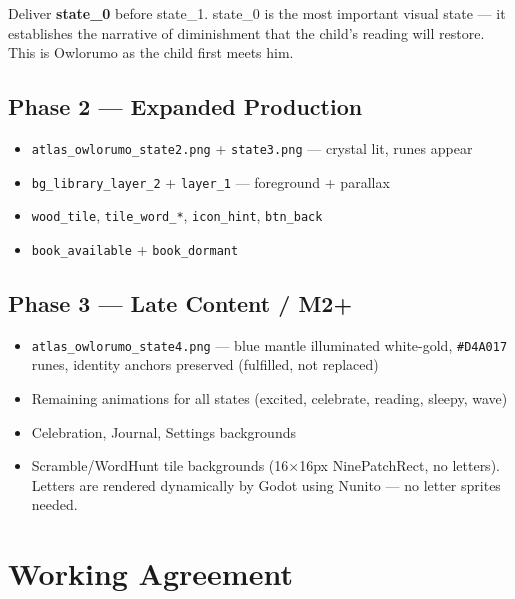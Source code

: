 \documentclass[11pt, a4paper]{article}
\newcommand{\hex}[1]{\textcolor[HTML]{#1}{\texttt{\##1}}}
\begin{document}
\begin{notebox}
  Deliver \textbf{state\_0} before state\_1. state\_0 is the most important visual state
  --- it establishes the narrative of diminishment that the child's reading will restore.
  This is Owlorumo as the child first meets him.
\end{notebox}

\subsection{Phase 2 --- Expanded Production}
\begin{itemize}[leftmargin=1.5em, itemsep=2pt]
  \item \texttt{atlas\_owlorumo\_state2.png} + \texttt{state3.png} --- crystal lit, runes appear
  \item \texttt{bg\_library\_layer\_2} + \texttt{layer\_1} --- foreground + parallax
  \item \texttt{wood\_tile}, \texttt{tile\_word\_*}, \texttt{icon\_hint}, \texttt{btn\_back}
  \item \texttt{book\_available} + \texttt{book\_dormant}
\end{itemize}

\subsection{Phase 3 --- Late Content / M2+}
\begin{itemize}[leftmargin=1.5em, itemsep=2pt]
  \item \texttt{atlas\_owlorumo\_state4.png} --- blue mantle illuminated white-gold, \hex{D4A017} runes, identity anchors preserved (fulfilled, not replaced)
  \item Remaining animations for all states (excited, celebrate, reading, sleepy, wave)
  \item Celebration, Journal, Settings backgrounds
  \item Scramble/WordHunt tile backgrounds (16×16px NinePatchRect, no letters).
    Letters are rendered dynamically by Godot using Nunito — no letter sprites needed.
\end{itemize}

\section{Working Agreement}
\end{document}
